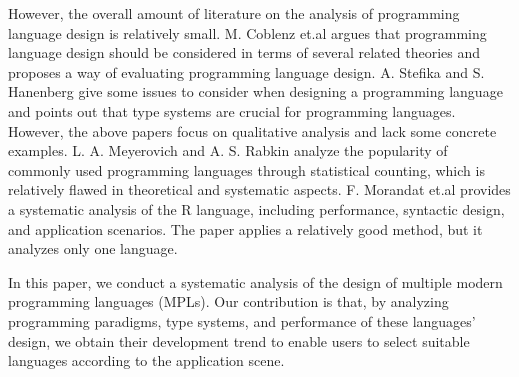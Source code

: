 However, the overall amount of literature on the analysis of
programming language design is relatively small.
M. Coblenz et.al argues that programming language design should be considered in terms
of several related theories and proposes a way of evaluating programming
language design\cite{coblenz2018interdisciplinary}.
A. Stefika and S. Hanenberg give some issues to consider when designing
a programming language and points out that type systems are crucial for
programming languages\cite{stefik2014programming}.
However, the above papers focus on qualitative analysis and lack
some concrete examples.
L. A. Meyerovich and A. S. Rabkin analyze the popularity of commonly
used programming languages through statistical counting,
which is relatively flawed in theoretical and systematic aspects\cite{meyerovich2013empirical}.
F. Morandat et.al provides a systematic analysis of the R language,
including performance, syntactic design, and application scenarios\cite{morandat2012evaluating}.
The paper applies a relatively good method, but it analyzes only one language.

In this paper, we conduct a systematic analysis of the design of
multiple modern programming languages (MPLs).
Our contribution is that, by analyzing programming paradigms, type systems, and performance of these languages' design,
we obtain their development trend to enable users to select suitable languages according to the application scene.



